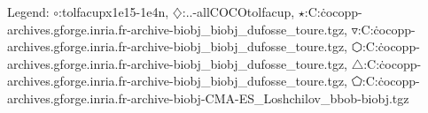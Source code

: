 Legend: {\color{NavyBlue}$\circ$}:tolfacupx1e15-1e4n, {\color{Magenta}$\diamondsuit$}:..-allCOCOtolfacup\notolfacup, {\color{Orange}$\star$}:C:\Users\dimo\.cocopp\data-archives\coco.gforge.inria.fr\data-archive\bbob-biobj\_biobj\_dufosse\_toure.tgz, {\color{CornflowerBlue}$\triangledown$}:C:\Users\dimo\.cocopp\data-archives\coco.gforge.inria.fr\data-archive\bbob-biobj\_biobj\_dufosse\_toure.tgz, {\color{red}$\varhexagon$}:C:\Users\dimo\.cocopp\data-archives\coco.gforge.inria.fr\data-archive\bbob-biobj\_biobj\_dufosse\_toure.tgz, {\color{YellowGreen}$\triangle$}:C:\Users\dimo\.cocopp\data-archives\coco.gforge.inria.fr\data-archive\bbob-biobj\_biobj\_dufosse\_toure.tgz, {\color{cyan}$\pentagon$}:C:\Users\dimo\.cocopp\data-archives\coco.gforge.inria.fr\data-archive\bbob-biobj\HMO-CMA-ES\_Loshchilov\_bbob-biobj.tgz